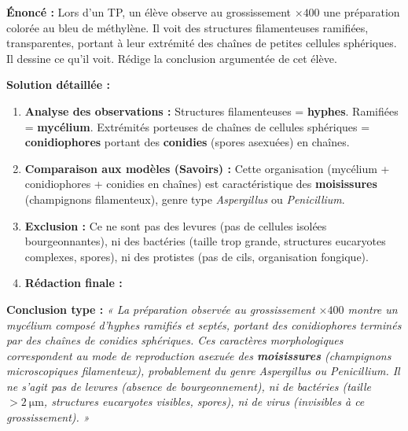 \documentclass[11pt]{article}
\begin{document}
\begin{exoresolu}
\textbf{Énoncé :} Lors d'un TP, un élève observe au grossissement $\times 400$ une préparation colorée au bleu de méthylène. Il voit des structures filamenteuses ramifiées, transparentes, portant à leur extrémité des chaînes de petites cellules sphériques. Il dessine ce qu'il voit. Rédige la conclusion argumentée de cet élève.

\textbf{Solution détaillée :}
\begin{enumerate}
    \item \textbf{Analyse des observations :} Structures filamenteuses = \textbf{hyphes}. Ramifiées = \textbf{mycélium}. Extrémités porteuses de chaînes de cellules sphériques = \textbf{conidiophores} portant des \textbf{conidies} (spores asexuées) en chaînes.
    \item \textbf{Comparaison aux modèles (Savoirs) :} Cette organisation (mycélium + conidiophores + conidies en chaînes) est caractéristique des \textbf{moisissures} (champignons filamenteux), genre type \emph{Aspergillus} ou \emph{Penicillium}.
    \item \textbf{Exclusion :} Ce ne sont pas des levures (pas de cellules isolées bourgeonnantes), ni des bactéries (taille trop grande, structures eucaryotes complexes, spores), ni des protistes (pas de cils, organisation fongique).
    \item \textbf{Rédaction finale :}
\end{enumerate}
\tcblower
\textbf{Conclusion type :}
\emph{« La préparation observée au grossissement $\times 400$ montre un mycélium composé d'hyphes ramifiés et septés, portant des conidiophores terminés par des chaînes de conidies sphériques. Ces caractères morphologiques correspondent au mode de reproduction asexuée des \textbf{moisissures} (champignons microscopiques filamenteux), probablement du genre \emph{Aspergillus} ou \emph{Penicillium}. Il ne s'agit pas de levures (absence de bourgeonnement), ni de bactéries (taille $> \SI{2}{\micro\meter}$, structures eucaryotes visibles, spores), ni de virus (invisibles à ce grossissement). »}
\end{exoresolu}
\end{document}
